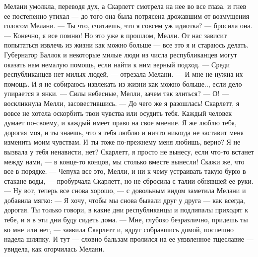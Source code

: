 Мелани умолкла, переводя дух, а Скарлетт смотрела на нее во все глаза, и гнев ее постепенно утихал — до того она была потрясена дрожавшим от возмущения голосом Мелани.
— Ты что, считаешь, что я совсем уж идиотка? — бросила она. — Конечно, я все помню! Но это уже в прошлом, Мелли. От нас зависит попытаться извлечь из жизни как можно больше — все это я и стараюсь делать. Губернатор Баллок и некоторые милые люди из числа республиканцев могут оказать нам немалую помощь, если найти к ним верный подход.
— Среди республиканцев нет милых людей, — отрезала Мелани. — И мне не нужна их помощь. И я не собираюсь извлекать из жизни как можно больше.., если дело упирается в янки.
— Силы небесные, Мелли, зачем так злиться?
— О! — воскликнула Мелли, засовестившись. — До чего же я разошлась! Скарлетт, я вовсе не хотела оскорбить твои чувства или осудить тебя. Каждый человек думает по-своему, и каждый имеет право на свое мнение. Я же люблю тебя, дорогая моя, и ты знаешь, что я тебя люблю и ничто никогда не заставит меня изменить моим чувствам. И ты тоже по-прежнему меня любишь, верно? Я не вызвала у тебя ненависти, нет? Скарлетт, я просто не вынесу, если что-то встанет между нами, — в конце-то концов, мы столько вместе вынесли! Скажи же, что все в порядке.
— Чепуха все это, Мелли, и ни к чему устраивать такую бурю в стакане воды, — пробурчала Скарлетт, но не сбросила с талии обнявшей ее руки.
— Ну вот, теперь все снова хорошо, — с довольным видом заметила Мелани и добавила мягко: — Я хочу, чтобы мы снова бывали друг у друга — как всегда, дорогая. Ты только говори, в какие дни республиканцы и подлипалы приходят к тебе, и я в эти дни буду сидеть дома.
— Мне, глубоко безразлично, придешь ты ко мне или нет, — заявила Скарлетт и, вдруг собравшись домой, поспешно надела шляпку. И тут — словно бальзам пролился на ее уязвленное тщеславие — увидела, как огорчилась Мелани.





